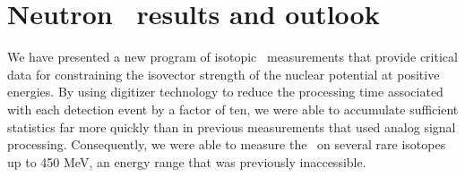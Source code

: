 \section{Neutron \tot\ results and outlook}
We have presented a new program of isotopic \tot\ measurements that provide critical data for
constraining the isovector strength of the nuclear potential at positive energies. By using
digitizer technology to reduce the processing time associated with each detection event by a factor
of ten, we were able to accumulate sufficient statistics far more quickly than in previous
measurements that used analog signal processing. Consequently, we were able to measure the \tot\ on
several rare isotopes up to 450 MeV, an energy range that was previously inaccessible.



